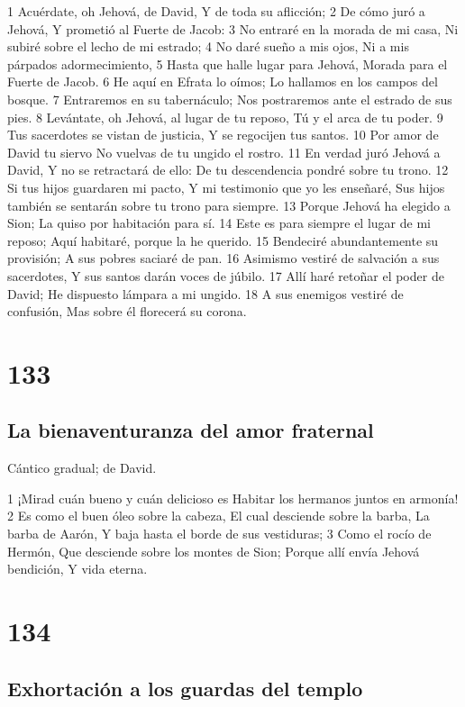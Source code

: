 1 Acuérdate, oh Jehová, de David,
Y de toda su aflicción;
2 De cómo juró a Jehová,
Y prometió al Fuerte de Jacob:
3 No entraré en la morada de mi casa,
Ni subiré sobre el lecho de mi estrado;
4 No daré sueño a mis ojos,
Ni a mis párpados adormecimiento,
5 Hasta que halle lugar para Jehová,
Morada para el Fuerte de Jacob.
6 He aquí en Efrata lo oímos;
Lo hallamos en los campos del bosque.
7 Entraremos en su tabernáculo;
Nos postraremos ante el estrado de sus pies.
8 Levántate, oh Jehová, al lugar de tu reposo,
Tú y el arca de tu poder.
9 Tus sacerdotes se vistan de justicia,
Y se regocijen tus santos.
10 Por amor de David tu siervo
No vuelvas de tu ungido el rostro.
11 En verdad juró Jehová a David,
Y no se retractará de ello:
De tu descendencia pondré sobre tu trono.
12 Si tus hijos guardaren mi pacto,
Y mi testimonio que yo les enseñaré,
Sus hijos también se sentarán sobre tu trono para siempre.
13 Porque Jehová ha elegido a Sion;
La quiso por habitación para sí.
14 Este es para siempre el lugar de mi reposo;
Aquí habitaré, porque la he querido.
15 Bendeciré abundantemente su provisión;
A sus pobres saciaré de pan.
16 Asimismo vestiré de salvación a sus sacerdotes,
Y sus santos darán voces de júbilo.
17 Allí haré retoñar el poder de David;
He dispuesto lámpara a mi ungido.
18 A sus enemigos vestiré de confusión,
Mas sobre él florecerá su corona.

\chapter{133}

\section*{La bienaventuranza del amor fraternal}

Cántico gradual; de David.

1 ¡Mirad cuán bueno y cuán delicioso es
Habitar los hermanos juntos en armonía!
2 Es como el buen óleo sobre la cabeza,
El cual desciende sobre la barba,
La barba de Aarón,
Y baja hasta el borde de sus vestiduras;
3 Como el rocío de Hermón,
Que desciende sobre los montes de Sion;
Porque allí envía Jehová bendición,
Y vida eterna.

\chapter{134}

\section*{Exhortación a los guardas del templo}

